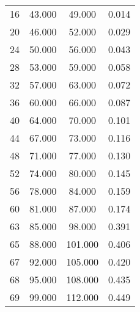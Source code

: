 % 
\begin{tabular}{cccc}
  \hline
  \hline
16 & 43.000 & 49.000 & 0.014 \\ 
  20 & 46.000 & 52.000 & 0.029 \\ 
  24 & 50.000 & 56.000 & 0.043 \\ 
  28 & 53.000 & 59.000 & 0.058 \\ 
  32 & 57.000 & 63.000 & 0.072 \\ 
  36 & 60.000 & 66.000 & 0.087 \\ 
  40 & 64.000 & 70.000 & 0.101 \\ 
  44 & 67.000 & 73.000 & 0.116 \\ 
  48 & 71.000 & 77.000 & 0.130 \\ 
  52 & 74.000 & 80.000 & 0.145 \\ 
  56 & 78.000 & 84.000 & 0.159 \\ 
  60 & 81.000 & 87.000 & 0.174 \\ 
  63 & 85.000 & 98.000 & 0.391 \\ 
  65 & 88.000 & 101.000 & 0.406 \\ 
  67 & 92.000 & 105.000 & 0.420 \\ 
  68 & 95.000 & 108.000 & 0.435 \\ 
  69 & 99.000 & 112.000 & 0.449 \\ 
   \hline
\end{tabular}
